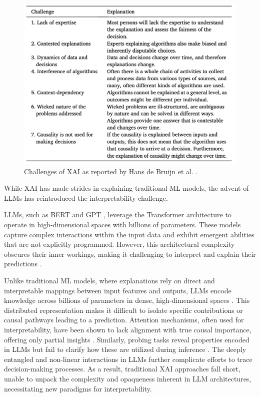 \documentclass[times, twoside, watermark]{zHenriquesLab-StyleBioRxiv}
\begin{document}
\begin{figure}[H]
\centering
\includegraphics[width=.8\linewidth]{Figures/challangesXAI.png}
\caption{Challenges of XAI as reported by Hans de Bruijn et al. \cite{DEBRUIJN2022101666}.}
\label{fig:challanges}
\end{figure}


While XAI has made strides in explaining traditional ML models, the advent of LLMs has reintroduced the interpretability challenge. 

LLMs, such as BERT \cite{devlin2018bert} and GPT \cite{radford2019language}, leverage the Transformer architecture to operate in high-dimensional spaces with billions of parameters. These models capture complex interactions within the input data and exhibit emergent abilities that are not explicitly programmed. However, this architectural complexity obscures their inner workings, making it challenging to interpret and explain their predictions \cite{vaswani2017attention}.

Unlike traditional ML models, where explanations rely on direct and interpretable mappings between input features and outputs, LLMs encode knowledge across billions of parameters in dense, high-dimensional spaces \cite{devlin2018bert}. This distributed representation makes it difficult to isolate specific contributions or causal pathways leading to a prediction. Attention mechanisms, often used for interpretability, have been shown to lack alignment with true causal importance, offering only partial insights \cite{jain2019attention}. Similarly, probing tasks reveal properties encoded in LLMs but fail to clarify how these are utilized during inference \cite{conneau2018you}. The deeply entangled and non-linear interactions in LLMs further complicate efforts to trace decision-making processes. As a result, traditional XAI approaches fall short, unable to unpack the complexity and opaqueness inherent in LLM architectures, necessitating new paradigms for interpretability.
\end{document}
